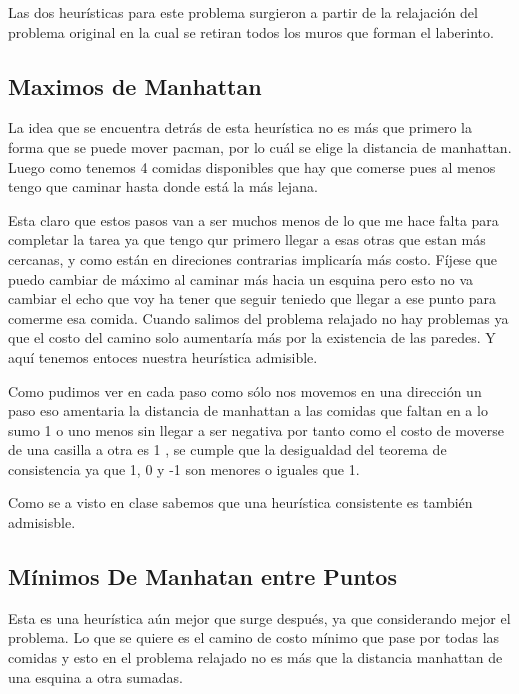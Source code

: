 \documentclass[a4paper,10pt,twocolumn]{article}
\begin{document}
Las dos heurísticas para este problema surgieron a partir de la relajación del problema original en la cual se retiran todos los muros que forman el laberinto.
   


	\subsection{Maximos de Manhattan}\label{sub:results}
 La idea que se encuentra detrás de esta heurística no es más que primero la forma que se puede mover pacman, por lo cuál se elige la distancia de manhattan. Luego como tenemos 4 comidas disponibles que hay que comerse pues al menos tengo que caminar hasta donde está la más lejana. 
 
 Esta claro que estos pasos van a ser muchos menos de lo que me hace falta para completar la tarea ya que tengo qur primero llegar a esas otras que estan más cercanas, y como están en direciones contrarias implicaría más costo. 
 Fíjese que puedo cambiar de máximo al caminar más hacia un esquina pero esto no va cambiar el echo que voy ha tener que seguir teniedo que llegar a ese punto para comerme esa comida. Cuando salimos del problema relajado no hay problemas ya que el costo del camino solo aumentaría más por la existencia de las paredes. Y aquí tenemos entoces nuestra heurística admisible.
 
 Como pudimos ver en cada paso como sólo nos movemos en una dirección un paso eso amentaria la distancia de manhattan a las comidas que faltan en a lo sumo 1 o uno menos sin llegar a ser negativa por tanto como el costo de moverse de una casilla a otra es 1 , se cumple que la desigualdad del teorema de consistencia ya que 1, 0 y -1 son menores o iguales que 1.
 
 Como se a visto en clase sabemos que una heurística consistente es también admisisble.    
  
	\subsection{Mínimos De Manhatan entre Puntos}\label{sub:lists}
Esta es una heurística aún mejor que surge después, ya que considerando mejor el problema. Lo que se quiere es el camino de costo mínimo que pase por todas las comidas y esto en el problema relajado no es más que la distancia manhattan de  una esquina a otra sumadas. 
\end{document}
